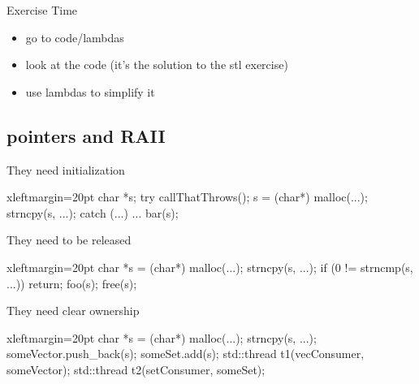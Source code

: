 \begin{frame}[fragile]
  \begin{alertblock}{Exercise Time}
    \begin{itemize}
    \item go to code/lambdas
    \item look at the code (it's the solution to the stl exercise)
    \item use lambdas to simplify it
    \end{itemize}
  \end{alertblock}
\end{frame}

\subsection[RAII]{pointers and RAII}

\begin{frame}[fragile]
  \begin{exampleblock}{They need initialization
      \hfill {}}
    \begin{cppcode*}{xleftmargin=20pt}
      char *s;
      try {
        callThatThrows();
        s = (char*) malloc(...);
        strncpy(s, ...);
      } catch (...) { ... }
      bar(s);
    \end{cppcode*}
  \end{exampleblock}
  \pause
  \pause
  \vspace{-2cm}
  \begin{exampleblock}{They need to be released
      \hfill {}}
    \begin{cppcode*}{xleftmargin=20pt}
      char *s = (char*) malloc(...);
      strncpy(s, ...);
      if (0 != strncmp(s, ...)) return;
      foo(s);
      free(s);
    \end{cppcode*}
  \end{exampleblock}
  \pause
  \pause
  \vspace{-2cm}
  \begin{exampleblock}{They need clear ownership
      \hfill {}}
    \begin{cppcode*}{xleftmargin=20pt}
      char *s = (char*) malloc(...);
      strncpy(s, ...);
      someVector.push_back(s);
      someSet.add(s);
      std::thread t1(vecConsumer, someVector);
      std::thread t2(setConsumer, someSet);
    \end{cppcode*}
  \end{exampleblock}
\end{frame}

